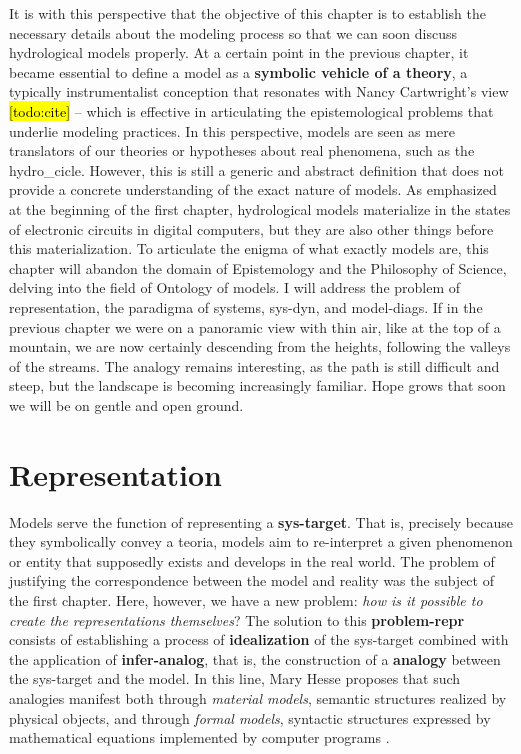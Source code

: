 \documentclass[./main_en.tex]{subfiles}
\begin{document}
\par It is with this perspective that the objective of this chapter is to establish the necessary details about the modeling process so that we can soon discuss hydrological models properly. At a certain point in the previous chapter, it became essential to define a \gls{model} as a \textbf{symbolic vehicle of a theory}, a typically instrumentalist conception that resonates with Nancy Cartwright's view \hl{[todo:cite]} -- which is effective in articulating the epistemological problems that underlie modeling practices. In this perspective, models are seen as mere translators of our theories or hypotheses about real phenomena, such as the \gls{hydro_cicle}. However, this is still a generic and abstract definition that does not provide a concrete understanding of the exact nature of models. As emphasized at the beginning of the first chapter, hydrological models materialize in the states of electronic circuits in digital computers, but they are also other things before this materialization. To articulate the enigma of what exactly models are, this chapter will abandon the domain of Epistemology and the Philosophy of Science, delving into the field of Ontology of models. I will address the problem of representation, the \gls{paradigma} of systems, \gls{sys-dyn}, and \gls{model-diags}. If in the previous chapter we were on a panoramic view with thin air, like at the top of a mountain, we are now certainly descending from the heights, following the valleys of the streams. The \gls{analogy} remains interesting, as the path is still difficult and steep, but the landscape is becoming increasingly familiar. Hope grows that soon we will be on gentle and open ground.

\section{Representation} \label{sec:sys:represent}

\par Models serve the function of representing a \textbf{\gls{sys-target}}. That is, precisely because they symbolically convey a \gls{teoria}, models aim to re-interpret a given phenomenon or entity that supposedly exists and develops in the real world. The problem of justifying the correspondence between the \gls{model} and reality was the subject of the first chapter. Here, however, we have a new problem: \textit{how is it possible to create the representations themselves}? The solution to this \textbf{\gls{problem-repr}} consists of establishing a process of \textbf{\gls{idealization}} of the \gls{sys-target} combined with the application of \textbf{\gls{infer-analog}}, that is, the construction of a \textbf{\gls{analogy}} between the \gls{sys-target} and the \gls{model}. In this line, Mary Hesse proposes that such analogies manifest both through \textit{material models}, semantic structures realized by physical objects, and through \textit{formal models}, syntactic structures expressed by mathematical equations implemented by computer programs \cite{hesse2017}.
\end{document}
